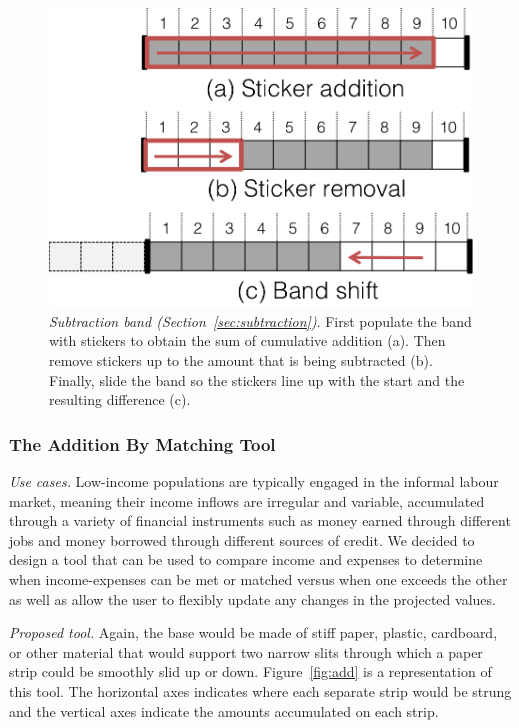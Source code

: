 \documentclass{sig-alternate}
\begin{document}
\begin{figure}
\centering
\includegraphics[width=.7\linewidth]{img/band.png}
\caption{\emph{Subtraction band (Section~\ref{sec:subtraction})}. First populate the band with stickers to obtain the sum of cumulative addition (a). Then remove stickers up to the amount that is being subtracted (b). Finally, slide the band so the stickers line up with the start and the resulting difference (c).}
\label{fig:band}
\end{figure}

\subsubsection{The Addition By Matching Tool}
\label{sec:add}

\emph{Use cases.} Low-income populations are typically engaged in the informal labour market, meaning their income inflows are irregular and variable, accumulated through a variety of financial instruments such as money earned through different jobs and money borrowed through different sources of credit. We decided to design a tool that can be used to compare income and expenses to determine when income-expenses can be met or matched versus when one exceeds the other as well as allow the user to flexibly update any changes in the projected values.

\emph{Proposed tool.} Again, the base would be made of stiff paper, plastic, cardboard, or other material that would support two narrow slits through which a paper strip could be smoothly slid up or down. Figure~\ref{fig:add} is a representation of this tool. The horizontal axes indicates where each separate strip would be strung and the vertical axes indicate the amounts accumulated on each strip.
\end{document}
